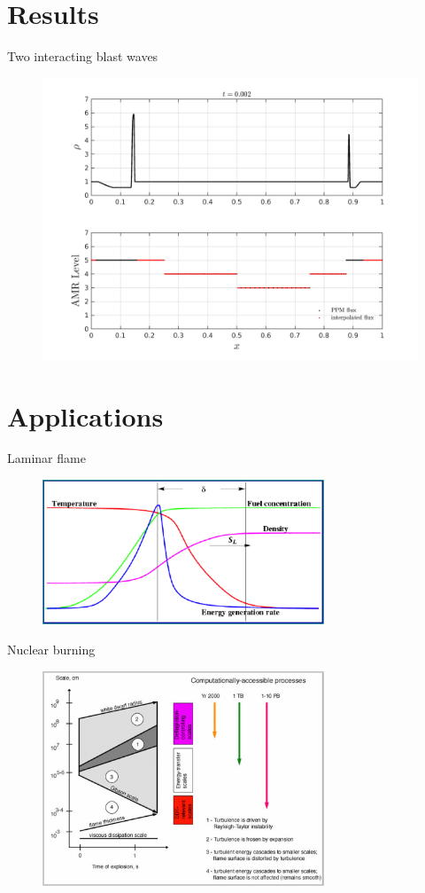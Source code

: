 \documentclass{beamer}
\begin{document}
\section{Results}

\begin{frame}{Two interacting blast waves}
  \begin{figure}
    \center
    \includegraphics[scale=0.4]{blast2_early.png}
  \end{figure}
\end{frame}

\section{Applications}

\begin{frame}{Laminar flame}
  \begin{figure}
    \center
      \includegraphics[width=0.75\textwidth]{laminarflame.png}
  \end{figure}
\end{frame}

\begin{frame}{Nuclear burning}
  \begin{figure}
    \center
      \includegraphics[width=0.75\textwidth]{scales.png}
  \end{figure}
\end{frame}
\end{document}
